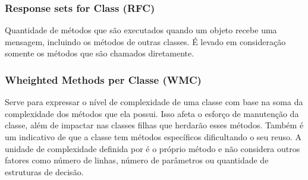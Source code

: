 \documentclass[conference]{IEEEtran}
\begin{document}
\subsubsection{\textbf{Response sets for Class (RFC)}} Quantidade de métodos
que são executados quando um objeto recebe uma mensagem, incluindo os métodos de outras classes. É
levado em consideração somente os métodos que são chamados diretamente.




\subsubsection{\textbf{Wheighted Methods per Classe (WMC)}} Serve para expressar
o nível de complexidade de uma classe com base na soma da complexidade dos métodos que ela
possui. Isso afeta o esforço de manutenção da classe, além de impactar nas
classes filhas que herdarão esses métodos. Também é um indicativo de que a
classe tem métodos específicos dificultando o seu reuso. A unidade de
complexidade definida por \cite{cksuite} é o próprio método e não
considera outros fatores como número de linhas, número de parâmetros ou
quantidade de estruturas de decisão.


%	

\end{document}
